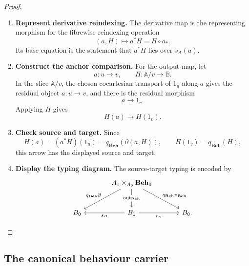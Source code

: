 \begin{proof}
    \leavevmode
    \begin{enumerate}
        \item \textbf{Represent derivative reindexing.} The derivative map is the representing morphism for the fibrewise reindexing operation
        \[
            (a,H)\longmapsto a^*H=H\circ a_*.
        \]
        Its base equation is the statement that \(a^*H\) lies over \(s_A(a)\).

        \item \textbf{Construct the anchor comparison.} For the output map, let
        \[
            a:u\to v,
            \qquad
            H:\mathbb A/v\to\mathbb B.
        \]
        In the slice \(\mathbb A/v\), the chosen cocartesian transport of \(1_u\) along \(a\) gives the residual object \(a:u\to v\), and there is the residual morphism
        \[
            a\to 1_v.
        \]
        Applying \(H\) gives
        \[
            H(a)\to H(1_v).
        \]

        \item \textbf{Check source and target.} Since
        \[
            H(a)=(a^*H)(1_u)=q_{\mathbf{Beh}}(\partial(a,H)),
            \qquad
            H(1_v)=q_{\mathbf{Beh}}(H),
        \]
        this arrow has the displayed source and target.

        \item \textbf{Display the typing diagram.} The source-target typing is encoded by
        \[
            \begin{tikzcd}[column sep=large, row sep=large]
                &
                    A_1\times_{A_0}\mathbf{Beh}_0
                        \arrow[dl, "q_{\mathbf{Beh}}\partial"']
                        \arrow[dr, "q_{\mathbf{Beh}}\pi_{\mathbf{Beh}}"]
                        \arrow[d, "\mathrm{out}_{\mathbf{Beh}}" description]
                &
                \\
                    B_0
                &
                    B_1
                        \arrow[l, "s_B"]
                        \arrow[r, "t_B"']
                &
                    B_0.
            \end{tikzcd}
        \]
    \end{enumerate}
\end{proof}

\subsection{The canonical behaviour carrier}
\label{subsec:canonical-behaviour-carrier}


